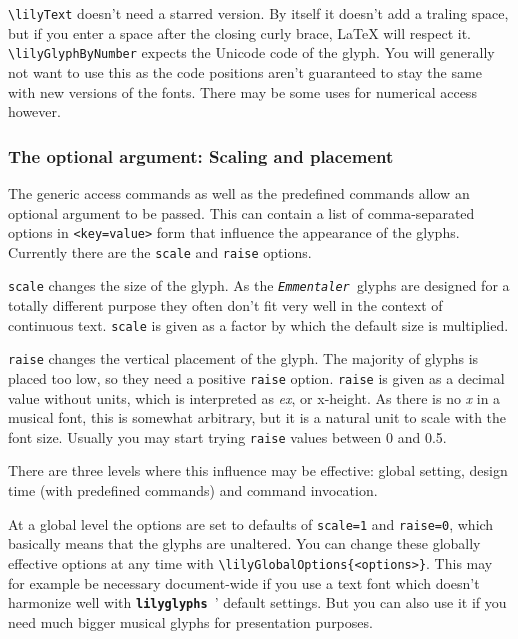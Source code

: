 \documentclass{article}
\newcommand*{\lilyglyphs}{\texttt{\textbf{lilyglyphs\,}}}
\newcommand*{\emmentaler}{\texttt{\textit{Emmentaler }}}
\newcommand*{\cmd}[1]{\texttt{\textbackslash #1}}
\begin{document}
\cmd{lilyText} doesn't need a starred version. 
By itself it doesn't add a traling space, but if you enter a space after the closing curly brace, \LaTeX{} will respect it.\\

\cmd{lilyGlyphByNumber} expects the Unicode code of the glyph. 
You will generally not want to use this as the code positions aren't guaranteed to stay the same with new versions of the fonts. 
There may be some uses for numerical access however.

\subsubsection{The optional argument: Scaling and placement}\label{subsubsec:optional_arguemnt}
The generic access commands as well as the predefined commands allow an optional argument to be passed.
This can contain a list of comma-separated options in \texttt{<key=value>} form that influence the appearance of the glyphs. Currently there are the \texttt{scale} and \texttt{raise} options.

\texttt{scale} changes the size of the glyph. 
As the \emmentaler glyphs are designed for a totally different purpose they often don't fit very well in the context of continuous text.
\texttt{scale} is given as a factor by which the default size is multiplied.

\texttt{raise} changes the vertical placement of the glyph.
The majority of glyphs is placed too low, so they need a positive \texttt{raise} option.
\texttt{raise} is given as a decimal value without units, which is interpreted as \emph{ex}, or x-height. 
As there is no \emph{x} in a musical font, this is somewhat arbitrary, but it is a natural unit to scale with the font size.
Usually you may start trying \texttt{raise} values between 0 and 0.5.

There are three levels where this influence may be effective: global setting, design time (with predefined commands) and command invocation.

At a global level the options are set to defaults of \texttt{scale=1} and \texttt{raise=0}, which basically means that the glyphs are unaltered.
You can change these globally effective options at any time with \cmd{lilyGlobalOptions\{<options>\}}.
This may for example be necessary document-wide if you use a text font which doesn't harmonize well with \lilyglyphs' default settings.
But you can also use it if you need much bigger musical glyphs for presentation purposes.
\end{document}
